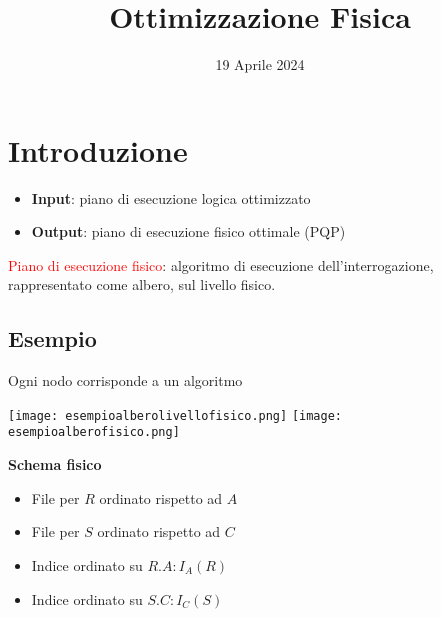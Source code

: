 \documentclass[12pt]{article}
\title{Ottimizzazione Fisica}
\date{19 Aprile 2024}
\begin{document}
\maketitle
\section{Introduzione}
\begin{itemize}
    \item \textbf{Input}: piano di esecuzione logica ottimizzato
    \item \textbf{Output}: piano di esecuzione fisico ottimale (PQP)
\end{itemize}
\textcolor{red}{Piano di esecuzione fisico}: algoritmo di esecuzione dell'interrogazione, rappresentato come albero, sul livello fisico.
\subsection{Esempio}
Ogni nodo corrisponde a un algoritmo
\begin{center}
    \texttt{[image: esempioalberolivellofisico.png]}
    \texttt{[image: esempioalberofisico.png]}
\end{center}
\textbf{Schema fisico}
\begin{itemize}
    \item File per $R$ ordinato rispetto ad $A$
    \item File per $S$ ordinato rispetto ad $C$
    \item Indice ordinato su $R.A:I_{A}(R)$
    \item Indice ordinato su $S.C:I_{C}(S)$
\end{itemize}
\end{document}
